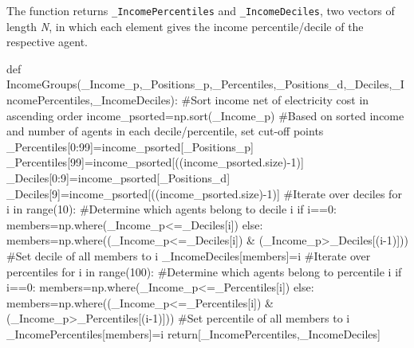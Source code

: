 \documentclass[
  letterpaper,
  DIV=11,
  numbers=noendperiod]{scrartcl}
\newenvironment{Shaded}{\begin{snugshade}}{\end{snugshade}}
\newcommand{\BuiltInTok}[1]{\textcolor[rgb]{0.00,0.23,0.31}{#1}}
\newcommand{\CommentTok}[1]{\textcolor[rgb]{0.37,0.37,0.37}{#1}}
\newcommand{\ControlFlowTok}[1]{\textcolor[rgb]{0.00,0.23,0.31}{#1}}
\newcommand{\DecValTok}[1]{\textcolor[rgb]{0.68,0.00,0.00}{#1}}
\newcommand{\KeywordTok}[1]{\textcolor[rgb]{0.00,0.23,0.31}{#1}}
\newcommand{\NormalTok}[1]{\textcolor[rgb]{0.00,0.23,0.31}{#1}}
\newcommand{\OperatorTok}[1]{\textcolor[rgb]{0.37,0.37,0.37}{#1}}
\begin{document}
The function returns \texttt{\_IncomePercentiles} and
\texttt{\_IncomeDeciles}, two vectors of length \emph{N}, in which each
element gives the income percentile/decile of the respective agent.

\begin{Shaded}
\begin{Highlighting}[]
\KeywordTok{def}\NormalTok{ IncomeGroups(\_Income\_p,\_Positions\_p,\_Percentiles,\_Positions\_d,\_Deciles,\_IncomePercentiles,\_IncomeDeciles):}
    \CommentTok{\#Sort income net of electricity cost in ascending order}
\NormalTok{    income\_psorted}\OperatorTok{=}\NormalTok{np.sort(\_Income\_p)}
    \CommentTok{\#Based on sorted income and number of agents in each decile/percentile, set cut{-}off points}
\NormalTok{    \_Percentiles[}\DecValTok{0}\NormalTok{:}\DecValTok{99}\NormalTok{]}\OperatorTok{=}\NormalTok{income\_psorted[\_Positions\_p]}
\NormalTok{    \_Percentiles[}\DecValTok{99}\NormalTok{]}\OperatorTok{=}\NormalTok{income\_psorted[((income\_psorted.size)}\OperatorTok{{-}}\DecValTok{1}\NormalTok{)]}
\NormalTok{    \_Deciles[}\DecValTok{0}\NormalTok{:}\DecValTok{9}\NormalTok{]}\OperatorTok{=}\NormalTok{income\_psorted[\_Positions\_d]}
\NormalTok{    \_Deciles[}\DecValTok{9}\NormalTok{]}\OperatorTok{=}\NormalTok{income\_psorted[((income\_psorted.size)}\OperatorTok{{-}}\DecValTok{1}\NormalTok{)]}
    \CommentTok{\#Iterate over deciles}
    \ControlFlowTok{for}\NormalTok{ i }\KeywordTok{in} \BuiltInTok{range}\NormalTok{(}\DecValTok{10}\NormalTok{):}
        \CommentTok{\#Determine which agents belong to decile i}
        \ControlFlowTok{if}\NormalTok{ i}\OperatorTok{==}\DecValTok{0}\NormalTok{:}
\NormalTok{            members}\OperatorTok{=}\NormalTok{np.where(\_Income\_p}\OperatorTok{\textless{}=}\NormalTok{\_Deciles[i])}
        \ControlFlowTok{else}\NormalTok{:}
\NormalTok{            members}\OperatorTok{=}\NormalTok{np.where((\_Income\_p}\OperatorTok{\textless{}=}\NormalTok{\_Deciles[i]) }\OperatorTok{\&}\NormalTok{ (\_Income\_p}\OperatorTok{\textgreater{}}\NormalTok{\_Deciles[(i}\OperatorTok{{-}}\DecValTok{1}\NormalTok{)]))}
        \CommentTok{\#Set decile of all members to i}
\NormalTok{        \_IncomeDeciles[members]}\OperatorTok{=}\NormalTok{i}
    \CommentTok{\#Iterate over percentiles}
    \ControlFlowTok{for}\NormalTok{ i }\KeywordTok{in} \BuiltInTok{range}\NormalTok{(}\DecValTok{100}\NormalTok{):}
        \CommentTok{\#Determine which agents belong to percentile i}
        \ControlFlowTok{if}\NormalTok{ i}\OperatorTok{==}\DecValTok{0}\NormalTok{:}
\NormalTok{            members}\OperatorTok{=}\NormalTok{np.where(\_Income\_p}\OperatorTok{\textless{}=}\NormalTok{\_Percentiles[i])}
        \ControlFlowTok{else}\NormalTok{:}
\NormalTok{            members}\OperatorTok{=}\NormalTok{np.where((\_Income\_p}\OperatorTok{\textless{}=}\NormalTok{\_Percentiles[i]) }\OperatorTok{\&}\NormalTok{ (\_Income\_p}\OperatorTok{\textgreater{}}\NormalTok{\_Percentiles[(i}\OperatorTok{{-}}\DecValTok{1}\NormalTok{)]))}
        \CommentTok{\#Set percentile of all members to i}
\NormalTok{        \_IncomePercentiles[members]}\OperatorTok{=}\NormalTok{i}
    \ControlFlowTok{return}\NormalTok{[\_IncomePercentiles,\_IncomeDeciles]}
\end{Highlighting}
\end{Shaded}
\end{document}
